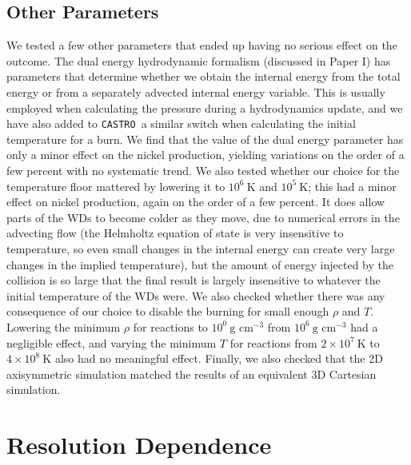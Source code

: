 \documentclass[twocolumn,numberedappendix]{../aastex6}
\newcommand{\castro}{\texttt{CASTRO}}
\begin{document}
\subsection{Other Parameters}

We tested a few other parameters that ended up having no serious effect on the outcome.
The dual energy hydrodynamic formalism (discussed in Paper I) has parameters that determine
whether we obtain the internal energy from the total energy or from a separately advected
internal energy variable. This is usually employed when calculating the pressure during
a hydrodynamics update, and we have also added to \castro\ a similar switch when calculating
the initial temperature for a burn. We find that the value of the dual energy parameter has
only a minor effect on the nickel production, yielding variations on the order of a few percent
with no systematic trend. We also tested whether our choice for the temperature floor mattered
by lowering it to $10^6\ \text{K}$ and $10^5\ \text{K}$; this had a minor effect on nickel
production, again on the order of a few percent. It does allow parts of the WDs to
become colder as they move, due to numerical errors in the advecting flow (the Helmholtz
equation of state is very insensitive to temperature, so even small changes in the internal
energy can create very large changes in the implied temperature), but the amount of energy
injected by the collision is so large that the final result is largely insensitive to whatever
the initial temperature of the
WDs were. We also checked whether there was any consequence of our choice to disable the
burning for small enough $\rho$ and $T$. Lowering the minimum $\rho$ for reactions to
$10^0\ \text{g cm}^{-3}$ from $10^6\ \text{g cm}^{-3}$ had a negligible effect,
and varying the minimum $T$ for reactions from $2 \times 10^{7}\ \text{K}$ to
$4 \times 10^{8}\ \text{K}$ also had no meaningful effect. Finally, we also checked
that the 2D axisymmetric simulation matched the results of an equivalent 3D Cartesian simulation.




\section{Resolution Dependence}
\label{sec:resolution}
\end{document}

